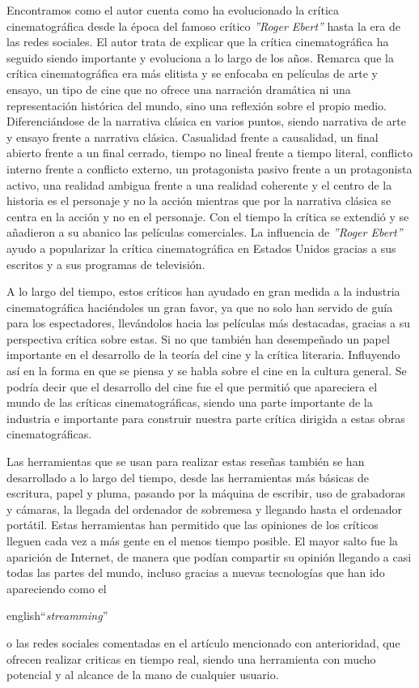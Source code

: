 Encontramos como el autor cuenta como ha evolucionado la crítica cinematográfica desde la época del 
famoso crítico \textit{''Roger Ebert''} hasta la era de las redes sociales. El autor trata de explicar 
que la crítica cinematográfica ha seguido siendo importante y evoluciona a lo largo de los años. Remarca 
que la crítica cinematográfica era más elitista y se enfocaba en películas de arte y ensayo, un 
tipo de cine que no ofrece una narración dramática ni una representación histórica del mundo, sino una 
reflexión sobre el propio medio. Diferenciándose de la narrativa clásica en varios puntos, siendo 
narrativa de arte y ensayo frente a narrativa clásica. Casualidad frente a  causalidad, un final 
abierto frente a un final cerrado, tiempo no lineal frente a tiempo literal, conflicto interno frente a 
conflicto externo, un protagonista pasivo frente a un protagonista activo, una realidad ambigua frente 
a una realidad coherente y el centro de la historia es el personaje y no la acción mientras que por la 
narrativa clásica se centra en la acción y no en el personaje. Con el tiempo la crítica se extendió y 
se añadieron a su abanico las películas comerciales. La influencia de \textit{''Roger Ebert''} ayudo a 
popularizar la crítica cinematográfica en Estados Unidos gracias a sus escritos y a sus programas de 
televisión. 

A lo largo del tiempo, estos críticos han ayudado en gran medida a la industria cinematográfica 
haciéndoles un gran favor, ya que no solo han servido de guía para los espectadores, llevándolos hacia 
las películas más destacadas, gracias a su perspectiva crítica sobre estas. Si no que también han 
desempeñado un papel importante en el desarrollo de la teoría del cine y la crítica literaria. 
Influyendo así en la forma en que se piensa y se habla sobre el cine en la cultura general. Se podría 
decir que el desarrollo del cine fue el que permitió que apareciera el mundo de las críticas 
cinematográficas, siendo una parte importante de la industria e importante para construir nuestra parte 
crítica dirigida a estas obras cinematográficas. 

Las herramientas que se usan para realizar estas reseñas también se han desarrollado a lo largo del 
tiempo, desde las herramientas más básicas de escritura, papel y pluma, pasando por la máquina de 
escribir, uso de grabadoras y cámaras, la llegada del ordenador de sobremesa y llegando hasta el 
ordenador portátil. Estas herramientas han permitido que las opiniones de los críticos lleguen cada vez 
a más gente en el menos tiempo posible. El mayor salto fue la aparición de Internet, de manera que 
podían compartir su opinión llegando a casi todas las partes del mundo, incluso gracias a nuevas 
tecnologías que han ido apareciendo como el \begin{otherlanguage}
{english}``\textit{streamming}''\end{otherlanguage} o las redes sociales comentadas en el artículo 
mencionado con anterioridad, que ofrecen realizar criticas en tiempo real, siendo una herramienta con 
mucho potencial y al alcance de la mano de cualquier usuario.

